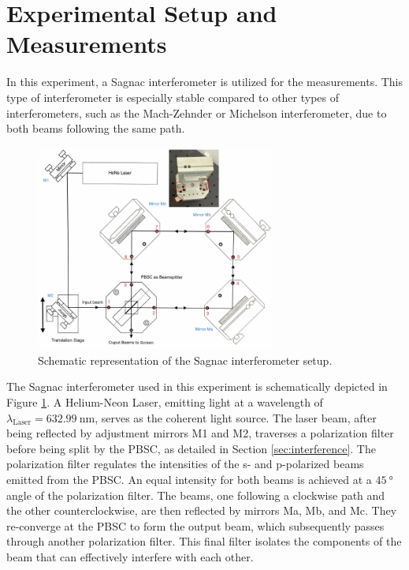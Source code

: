 \section{Experimental Setup and Measurements}
\label{sec:procedure}
In this experiment, a Sagnac interferometer is utilized for the measurements. 
This type of interferometer is especially stable compared to other types
of interferometers, such as the Mach-Zehnder or Michelson interferometer, due to
both beams following the same path.

\begin{figure}
    \centering
    \includegraphics[width=0.7\textwidth]{pictures/Sagnac.png}
    \caption{Schematic representation of the Sagnac interferometer setup. \cite{V64}}
    \label{fig:sagnac}
\end{figure}

The Sagnac interferometer used in this experiment is schematically depicted in Figure \ref{fig:sagnac}. 
A Helium-Neon Laser, emitting light at a wavelength of $\lambda_\text{Laser} = \SI{632.99}{\nano\meter}$, 
serves as the coherent light source. The laser beam, after being reflected by adjustment mirrors M1 and M2, 
traverses a polarization filter before being split by the PBSC, as detailed 
in Section \ref{sec:interference}. The polarization filter regulates the intensities of the s- and p-polarized 
beams emitted from the PBSC. An equal intensity for both beams is achieved at a $\SI{45}{\degree}$ angle 
of the polarization filter. The beams, one following a clockwise path and the other counterclockwise, are 
then reflected by mirrors Ma, Mb, and Mc. They re-converge at the PBSC to form the output beam, which 
subsequently passes through another polarization filter. This final filter isolates the components of the beam 
that can effectively interfere with each other.

